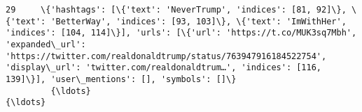 \documentclass[11pt]{article}
\begin{document}
\begin{Verbatim}[commandchars=\\\{\}]
         29     \{'hashtags': [\{'text': 'NeverTrump', 'indices': [81, 92]\}, \{'text': 'BetterWay', 'indices': [93, 103]\}, \{'text': 'ImWithHer', 'indices': [104, 114]\}], 'urls': [\{'url': 'https://t.co/MUK3sq7Mbh', 'expanded\_url': 'https://twitter.com/realdonaldtrump/status/763947916184522754', 'display\_url': 'twitter.com/realdonaldtrum…', 'indices': [116, 139]\}], 'user\_mentions': [], 'symbols': []\}                                                                                                                                                                                                                                                                                                                                                                                                                                                                                                                                                                                                                                                                                                                                                                                                                 
         {\ldots}                                                                                                                                                                                                                                                                                                                                                                                               {\ldots}                                                                                                                                                                                                                                                                                                                                                                                                                                                                                                                                                                                                                                                                                                                                                                                                                 

\end{Verbatim}
\end{document}
